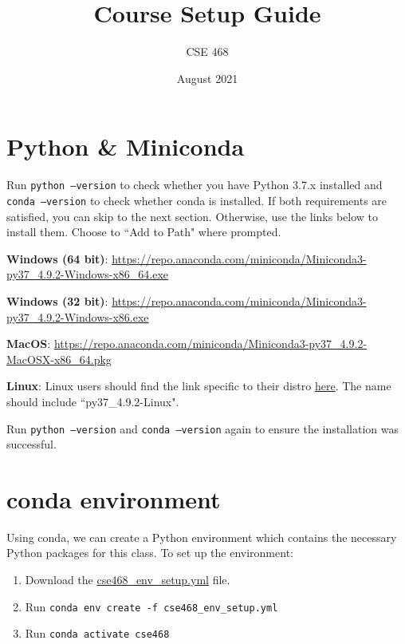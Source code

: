 \documentclass[12pt]{article}
\title{Course Setup Guide}
\author{CSE 468}
\date{August 2021}
\begin{document}
\maketitle

\tableofcontents
\newpage
\section{Python \& Miniconda}

Run \texttt{python --version} to check whether you have Python 3.7.x installed and \texttt{conda --version} to check whether conda is installed. If both requirements are satisfied, you can skip to the next section. Otherwise, use the links below to install them. Choose to ``Add to Path" where prompted. \newline

\textbf{Windows (64 bit)}:
\href{https://repo.anaconda.com/miniconda/Miniconda3-py37_4.9.2-Windows-x86_64.exe}{https://repo.anaconda.com/miniconda/Miniconda3-py37\_4.9.2-Windows-x86\_64.exe}\newline

\textbf{Windows (32 bit)}: \href{https://repo.anaconda.com/miniconda/Miniconda3-py37_4.9.2-Windows-x86.exe}{https://repo.anaconda.com/miniconda/Miniconda3-py37\_4.9.2-Windows-x86.exe}\newline

\textbf{MacOS}:
\href{https://repo.anaconda.com/miniconda/Miniconda3-py37_4.9.2-MacOSX-x86_64.pkg}{https://repo.anaconda.com/miniconda/Miniconda3-py37\_4.9.2-MacOSX-x86\_64.pkg}\newline

\textbf{Linux}:
Linux users should find the link specific to their distro \href{https://repo.anaconda.com/miniconda/}{here}. The name should include ``py37\_4.9.2-Linux". \newline

Run \texttt{python --version} and \texttt{conda --version} again to ensure the installation was successful.

\section{conda environment}
Using conda, we can create a Python environment which contains the necessary Python packages for this class. To set up the environment:
\begin{enumerate}
    \item Download the \href{FIXME}{cse468\_env\_setup.yml} file.
    \item Run \texttt{conda env create -f cse468\_env\_setup.yml}
    \item Run \texttt{conda activate cse468}
\end{enumerate}
\end{document}
